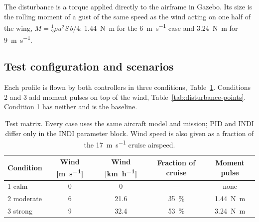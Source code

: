 \documentclass{article}
\begin{document}
The disturbance is a torque applied directly to the airframe in Gazebo. Its size is the rolling moment of a gust of the same speed as the wind acting on one half of the wing, $M=\tfrac12\rho u^2 S\,b/4$: \SI{1.44}{\newton\meter} for the \SI{6}{\meter\per\second} case and \SI{3.24}{\newton\meter} for \SI{9}{\meter\per\second}.

\subsection{Test configuration and scenarios}
\label{sec:test-scenarios}
Each profile is flown by both controllers in three conditions, Table~\ref{tab:test-matrix}. Conditions 2 and 3 add moment pulses on top of the wind, Table~\ref{tab:disturbance-points}. Condition 1 has neither and is the baseline.

\begin{table}[H]
\centering
\caption{Test matrix. Every case uses the same aircraft model and mission; PID and INDI differ only in the INDI parameter block. Wind speed is also given as a fraction of the \SI{17}{\meter\per\second} cruise airspeed.}
\label{tab:test-matrix}
\begin{tabular}{lcccc}
\hline
Condition & Wind [\si{\meter\per\second}] & Wind [\si{\kilo\meter\per\hour}] & Fraction of cruise & Moment pulse \\
\hline
1 calm      & 0 & 0    & ---               & none \\
2 moderate  & 6 & 21.6 & \SI{35}{\percent} & \SI{1.44}{\newton\meter} \\
3 strong    & 9 & 32.4 & \SI{53}{\percent} & \SI{3.24}{\newton\meter} \\
\hline
\end{tabular}
\end{table}
\end{document}
